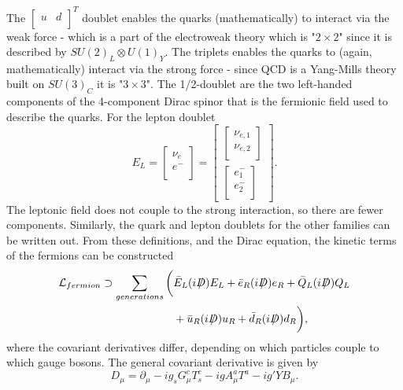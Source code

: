 The $\begin{bmatrix}
u &
d\\
\end{bmatrix}^T$ doublet enables the quarks (mathematically) to interact via the weak force - which is a part of the electroweak theory which is "$2\times 2$" since it is described by $SU(2)_L\otimes U(1)_Y$. The triplets enables the quarks to (again, mathematically) interact via the strong force - since QCD is a Yang-Mills theory built on $SU(3)_C$ it is "$3\times 3$". The 1/2-doublet are the two left-handed components of the 4-component Dirac spinor that is the fermionic field used to describe the quarks. For the lepton doublet
\begin{equation}
	E_L=\begin{bmatrix}
		\nu_e \\
		e^-\\
	\end{bmatrix}=\begin{bmatrix}
	\begin{bmatrix}
		\nu_{e,1}\\
		\nu_{e,2}\\
	\end{bmatrix} \\
	\begin{bmatrix}
		e^-_{1}\\
		e^-_{2}\\
	\end{bmatrix}
\end{bmatrix}.
\end{equation} 
The leptonic field does not couple to the strong interaction, so there are fewer components. Similarly, the quark and lepton doublets for the other families can be written out. From these definitions, and the Dirac equation, the kinetic terms of the fermions can be constructed
\begin{equation}
	\begin{split}
		\mathcal{L}_{fermion}\supset \sum_{generations}\bigg(&\bar{E}_L(i\slashed D)E_L+\bar{e}_R(i\slashed D)e_R+\bar{Q}_L(i \slashed D)Q_L\\
		&+\bar{u}_R(i \slashed D)u_R+\bar{d}_R(i \slashed D)d_R\bigg),
	\end{split}
\end{equation} 
where the covariant derivatives differ, depending on which particles couple to which gauge bosons. The general covariant derivative is given by
\begin{equation}
	D_\mu=\partial_\mu-ig_sG_\mu^cT_s^c-igA_\mu^aT^a-ig'YB_\mu.
\end{equation} 
